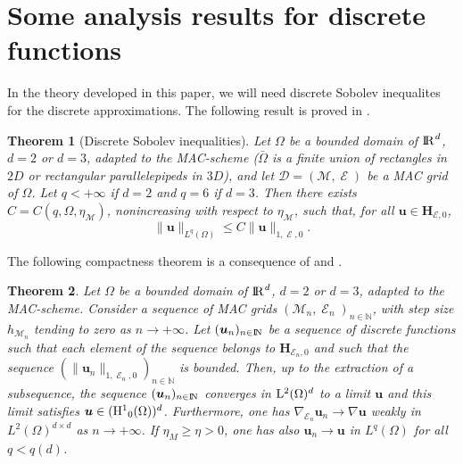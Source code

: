 \documentclass{amsart}
\newtheorem{thm}{Theorem}
\numberwithin{equation}{section}
\begin{document}
\section{Some analysis results for discrete functions}\label{disrot}

In the theory developed in this paper, we will need discrete Sobolev inequalites for the discrete approximations.
The following result is proved in \cite[Lemma 9.5 ]{eymard2000finite}.

\begin{thm}[Discrete Sobolev inequalities]\label{sobolev}
Let $\Omega$ be a bounded domain of ${\ifmmode{\rm	I\mkern-3.1mu
R\mkern1mu}\else{\rm I\kern-.18em 
R\hskip1pt\	}\fi\relax}^d$, $d=2$ or $d=3$, adapted to the MAC-scheme ($\bar \Omega$ is a finite union of rectangles in $2D$ or rectangular parallelepipeds in $3D$), and let ${{\mathcal D}}=({{\mathcal M}},\operatorname{{\mathcal{E}}})$ be a MAC grid of $\Omega$. Let $q< +\infty $ if $d=2$ and $ q=6$ if $d=3$. Then there exists $C = C(q,\Omega,\eta_{{\mathcal M}})$, nonincreasing with respect to $\eta_{{\mathcal M}}$, such that, for all $ {{\boldsymbol u}} \in {{\mathbf{H}_{{{\mathcal E}},0}}}$,
\begin{equation*}
\| {{\boldsymbol u}} \|_{L^q(\Omega)} \le C  \| {{\boldsymbol u}} \|_{1,\operatorname{{\mathcal{E}}},0}. 
\end{equation*}
\end{thm}
\medskip

The following compactness theorem is a consequence  of \cite[Theorem 9.1 and Lemma 9.5]{eymard2000finite} and \cite[Lemma 5.7]{eymard2009discretization}.

\begin{thm}
Let $\Omega$ be a bounded domain of ${\ifmmode{\rm	I\mkern-3.1mu
R\mkern1mu}\else{\rm I\kern-.18em 
R\hskip1pt\	}\fi\relax}^d$, $d=2$ or $d=3$, adapted to the MAC-scheme.
Consider a sequence of MAC grids $({{\mathcal M}}_n,\operatorname{{\mathcal{E}}}_n)_{n\in {\mathbb{N}}}$, with step size $h_{{{\mathcal M}}_n}$ tending to zero as ${{n {\rightarrow} + \infty}}$.
Let $({{\boldsymbol u}}_n)_{{n \in {\ifmmode{\rm	I\mkern-3.1mu
N\mkern0.5mu}\else{\rm I\kern-.16em
N\hskip0.5pt\ }\fi\relax}}}$  be a sequence of discrete functions such that each element of the sequence belongs to   ${{\mathbf{H}_{{{\mathcal E}}_n,0}}}$  and such that the sequence $ (\| {{\boldsymbol u}}_n \|_{1,\operatorname{{\mathcal{E}}}_n,0})_{n \in {\mathbb{N}}}$  is bounded.
Then, up to the extraction of a subsequence, the sequence $({{\boldsymbol u}}_n)_{{n \in {\ifmmode{\rm	I\mkern-3.1mu
N\mkern0.5mu}\else{\rm I\kern-.16em
N\hskip0.5pt\ }\fi\relax}}}$  converges in ${{\rm L}^{2}}(\Omega)^d$ to a limit ${{\boldsymbol u}}$  and this limit satisfies ${{\boldsymbol u}} \in ({{\rm H}^{1}}_0(\Omega))^d$.
Furthermore, one has $\nabla_{\operatorname{{\mathcal{E}}}_n} {{\boldsymbol u}}_n {\rightarrow} \nabla {{\boldsymbol u}}$ weakly in $L^2(\Omega)^{d \times d}$ as ${{n {\rightarrow} + \infty}}$.
If $\eta_M \ge \eta >0$, one has also ${{\boldsymbol u}}_n \to {{\boldsymbol u}}$ in $L^q(\Omega)$ for all $q < q(d)$.
\label{th:compactness}\end{thm}
\end{document}
